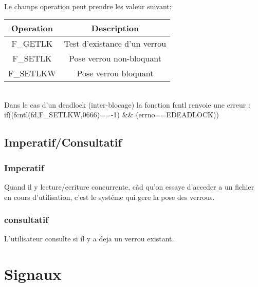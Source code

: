 \documentclass[a4paper,12pt,openany]{book}
\begin{document}
\\
Le champs operation peut prendre les valeur suivant:\\
\begin{tabular}{|c|c|}
\hline
Operation & Description \\ \hline
F_GETLK & Test d'existance d'un verrou \\
F_SETLK & Pose verrou non-bloquant \\
F_SETLKW & Pose verrou bloquant \\ \hline
\end{tabular}
\\
Dans le cas d'un deadlock (inter-blocage) la fonction fcntl renvoie une erreur :\\
if((fcntl(fd,F_SETLKW,0666)==-1) && (errno==EDEADLOCK))




\section{Imperatif/Consultatif}


\subsection{Imperatif}

Quand il y lecture/ecriture concurrente, càd qu'on essaye d'acceder a un fichier en cours d'utilisation, c'est le systéme qui gere la pose des verrous.\\


\subsection{consultatif}

L'utilisateur consulte si il y a deja un verrou existant.\\







\nexpage

\chapter{Signaux}
\end{document}
